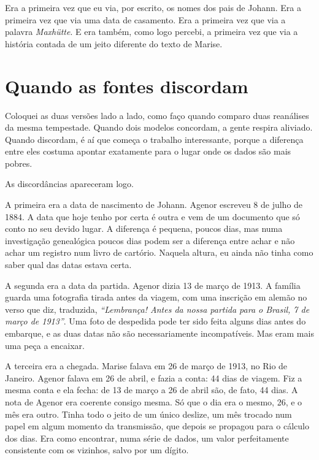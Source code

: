 \documentclass[
  brazilian,
  11pt,
  openany]{book}
\begin{document}
Era a primeira vez que eu via, por escrito, os nomes dos pais de Johann.
Era a primeira vez que via uma data de casamento. Era a primeira vez que
via a palavra \emph{Maxhütte}. E era também, como logo percebi, a
primeira vez que via a história contada de um jeito diferente do texto
de Marise.

\section{Quando as fontes discordam}\label{quando-as-fontes-discordam}

Coloquei as duas versões lado a lado, como faço quando comparo duas
reanálises da mesma tempestade. Quando dois modelos concordam, a gente
respira aliviado. Quando discordam, é aí que começa o trabalho
interessante, porque a diferença entre eles costuma apontar exatamente
para o lugar onde os dados são mais pobres.

As discordâncias apareceram logo.

A primeira era a data de nascimento de Johann. Agenor escreveu 8 de
julho de 1884. A data que hoje tenho por certa é outra e vem de um
documento que só conto no seu devido lugar. A diferença é pequena,
poucos dias, mas numa investigação genealógica poucos dias podem ser a
diferença entre achar e não achar um registro num livro de cartório.
Naquela altura, eu ainda não tinha como saber qual das datas estava
certa.

A segunda era a data da partida. Agenor dizia 13 de março de 1913. A
família guarda uma fotografia tirada antes da viagem, com uma inscrição
em alemão no verso que diz, traduzida, \emph{``Lembrança! Antes da nossa
partida para o Brasil, 7 de março de 1913''}. Uma foto de despedida pode
ter sido feita alguns dias antes do embarque, e as duas datas não são
necessariamente incompatíveis. Mas eram mais uma peça a encaixar.

A terceira era a chegada. Marise falava em 26 de março de 1913, no Rio
de Janeiro. Agenor falava em 26 de abril, e fazia a conta: 44 dias de
viagem. Fiz a mesma conta e ela fecha: de 13 de março a 26 de abril são,
de fato, 44 dias. A nota de Agenor era coerente consigo mesma. Só que o
dia era o mesmo, 26, e o mês era outro. Tinha todo o jeito de um único
deslize, um mês trocado num papel em algum momento da transmissão, que
depois se propagou para o cálculo dos dias. Era como encontrar, numa
série de dados, um valor perfeitamente consistente com os vizinhos,
salvo por um dígito.
\end{document}
